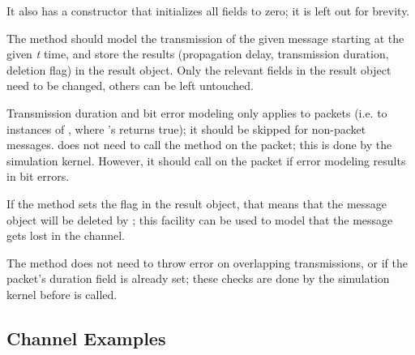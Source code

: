 It also has a constructor that initializes all fields to zero; it is left
out for brevity.

The method should model the transmission of the given message starting at
the given \textit{t} time, and store the results (propagation delay,
transmission duration, deletion flag) in the result object. Only the
relevant fields in the result object need to be changed, others can be left
untouched.

Transmission duration and bit error modeling only applies to packets (i.e.
to instances of , where 's
 returns true); it should be skipped for non-packet
messages.  does not need to call the 
method on the packet; this is done by the simulation kernel. However,
it should call  on the packet
if error modeling results in bit errors.

If the method sets the  flag in the result object, that
means that the message object will be deleted by {\opp}; this facility
can be used to model that the message gets lost in the channel.

The  method does not need to throw error on overlapping
transmissions, or if the packet's duration field is already set; these
checks are done by the simulation kernel before  is called.

%
%
%


\subsection{Channel Examples}
\label{sec:simple-modules:channel-examples}

